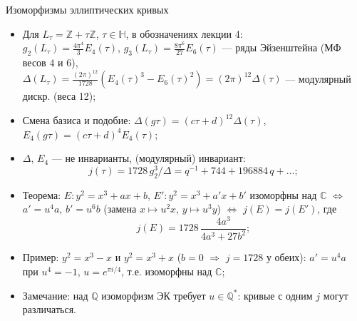 \documentclass[serif, aspectratio=169]{beamer}
\begin{document}
\begin{frame}{Изоморфизмы эллиптических кривых}
    \begin{itemize}
        \item Для $L_\tau=\mathbb{Z}+\tau\mathbb{Z}$, $\tau\in\mathbb{H}$, в обозначениях лекции 4:\\
        $g_2(L_\tau)=\frac{4\pi^4}{3}E_4(\tau)$, $g_3(L_\tau)=\frac{8\pi^6}{27}E_6(\tau)$ --- ряды Эйзенштейна (МФ весов $4$ и $6$),\\
        $\Delta(L_\tau)=\frac{(2\pi)^{12}}{1728}(E_4(\tau)^3-E_6(\tau)^2)=(2\pi)^{12}\Delta(\tau)$ --- модулярный дискр. (веса 12);
        \item Смена базиса и подобие: $\Delta(g\tau)=(c\tau+d)^{12}\Delta(\tau)$, $E_4(g\tau)=(c\tau+d)^4E_4(\tau)$;
        \item $\Delta$, $E_4$ --- не инварианты, (модулярный) инвариант:
        \[j(\tau)=1728\,g_2^3/\Delta=q^{-1}+744+196884\,q+\dots;\]
        \item Теорема: $E:y^2=x^3+ax+b$, $E':y^2=x^3+a'x+b'$ изоморфны над $\mathbb{C}$ $\Leftrightarrow$ $a'=u^4a$, $b'=u^6b$ (замена $x\mapsto u^2x$, $y\mapsto u^3y$) $\Leftrightarrow$ $j(E)=j(E')$, где
        \[j(E)=1728\,\frac{4a^3}{4a^3+27b^2};\]
        \item Пример: $y^2=x^3-x$ и $y^2=x^3+x$ ($b=0$ $\Rightarrow$ $j=1728$ у обеих): $a'=u^4a$ при $u^4=-1$, $u=e^{\pi i/4}$, т.е. изоморфны над $\mathbb{C}$;
        \item Замечание: над $\mathbb{Q}$ изоморфизм ЭК требует $u\in\mathbb{Q}^*$: кривые с одним $j$ могут различаться.
    \end{itemize}
    \note{
        \begin{itemize}
            \item ---
        \end{itemize}
    }
\end{frame}
\end{document}
